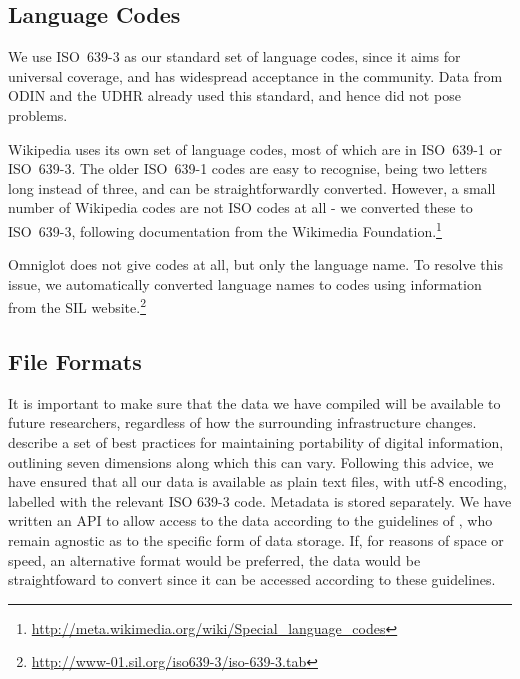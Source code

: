 
\subsection{Language Codes}
We use ISO~639-3 as our standard set of language codes, since it aims for universal coverage, and has widespread acceptance in the community. %
Data from ODIN and the UDHR already used this standard, and hence did not pose problems.

Wikipedia uses its own set of language codes, most of which are in ISO~639-1 or ISO~639-3.  The older ISO~639-1 codes are easy to recognise, being two letters long instead of three, and can be straightforwardly converted.  However, a small number of Wikipedia codes are not ISO codes at all - we converted these to ISO~639-3, following documentation from the Wikimedia Foundation.\footnote{\url{http://meta.wikimedia.org/wiki/Special_language_codes}}

Omniglot does not give codes at all, but only the language name. To resolve this issue, we automatically converted language names to codes using information from the SIL website.\footnote{\url{http://www-01.sil.org/iso639-3/iso-639-3.tab}}



\subsection{File Formats}

It is important to make sure that the data we have compiled will be available to future researchers, regardless of how the surrounding infrastructure changes.  describe a set of best practices for maintaining portability of digital information, outlining seven dimensions along which this can vary. Following this advice, we have ensured that all our data is available as plain text files, with utf-8 encoding, labelled with the relevant ISO 639-3 code. Metadata is stored separately. We have written an API to allow access to the data according to the guidelines of , who remain agnostic as to the specific form of data storage. If, for reasons of space or speed, an alternative format would be preferred, the data would be straightfoward to convert since it can be accessed according to these guidelines.
